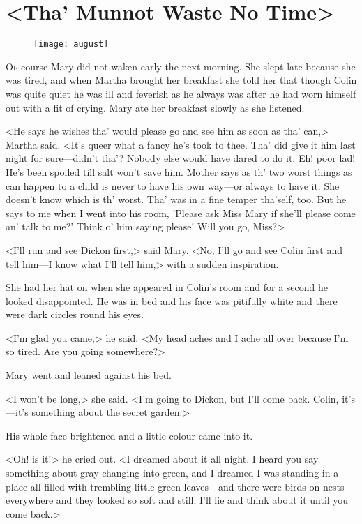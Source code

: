 \chapter{<Tha' Munnot Waste No Time>} 
	
\begin{figure}[t!]
\centering
\texttt{[image: august]}
\end{figure}

	\lettrine[]{O}{f} course Mary did not waken early the next morning. She slept late because she was tired, and when Martha brought her breakfast she told her that though Colin was quite quiet he was ill and feverish as he always was after he had worn himself out with a fit of crying. Mary ate her breakfast slowly as she listened.

<He says he wishes tha' would please go and see him as soon as tha' can,> Martha said. <It's queer what a fancy he's took to thee. Tha' did give it him last night for sure—didn't tha'? Nobody else would have dared to do it. Eh! poor lad! He's been spoiled till salt won't save him. Mother says as th' two worst things as can happen to a child is never to have his own way—or always to have it. She doesn't know which is th' worst. Tha' was in a fine temper tha'self, too. But he says to me when I went into his room, 'Please ask Miss Mary if she'll please come an' talk to me?' Think o' him saying please! Will you go, Miss?>

<I'll run and see Dickon first,> said Mary. <No, I'll go and see Colin first and tell him—I know what I'll tell him,> with a sudden inspiration.

She had her hat on when she appeared in Colin's room and for a second he looked disappointed. He was in bed and his face was pitifully white and there were dark circles round his eyes.

<I'm glad you came,> he said. <My head aches and I ache all over because I'm so tired. Are you going somewhere?>

Mary went and leaned against his bed.

<I won't be long,> she said. <I'm going to Dickon, but I'll come back. Colin, it's—it's something about the secret garden.>

His whole face brightened and a little colour came into it.

<Oh! is it!> he cried out. <I dreamed about it all night. I heard you say something about gray changing into green, and I dreamed I was standing in a place all filled with trembling little green leaves—and there were birds on nests everywhere and they looked so soft and still. I'll lie and think about it until you come back.>

